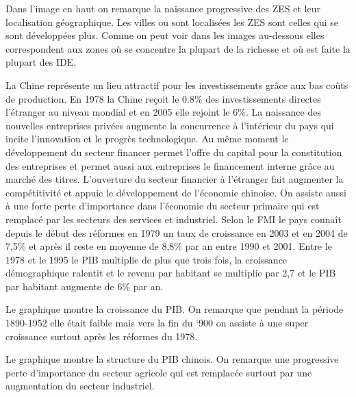 Dans l’image en haut on remarque la naissance progressive des ZES et leur localisation géographique. Les villes ou sont localisées les ZES sont celles qui se sont développées plus.
Comme on peut voir dans les images au-dessous elles correspondent aux zones où se concentre la plupart de la richesse et où est faite la plupart des IDE.

La Chine représente un lieu attractif pour les investissements grâce aux bas coûts de production. En 1978 la Chine reçoit le 0.8\%  des investissements directes l’étranger au niveau mondial et en 2005 elle rejoint le 6\%.  La naissance des nouvelles entreprises privées augmente la concurrence à l’intérieur du pays qui incite l’innovation et le progrès technologique.  Au même moment le développement du secteur financer permet l’offre du capital pour la constitution des entreprises et permet aussi aux entreprises le financement interne grâce au marché des titres.  L’ouverture du secteur financier à l’étranger fait augmenter la compétitivité et appuie le développement de l’économie chinoise. On assiste aussi à une forte perte d’importance dans l’économie du secteur primaire qui est remplacé par les secteurs des services et industriel. Selon le FMI le pays connaît depuis le début des réformes en 1979 un taux de croissance en 2003 et en 2004 de 7,5\% et après il reste en moyenne de 8,8\% par an entre 1990 et 2001. 
Entre le 1978 et le 1995 le PIB multiplie de plus que trois fois, la croissance démographique ralentit et le revenu par habitant se multiplie par 2,7 et le PIB par habitant augmente de 6\% par an.  

Le graphique montre la croissance du PIB. On remarque que pendant la période 1890-1952 elle était faible mais vers la fin du ‘900 on assiste à une super croissance surtout après les réformes du 1978.

Le graphique montre la structure du PIB chinois. On remarque une progressive perte d’importance du secteur agricole qui est remplacée surtout par une augmentation du secteur industriel. 


